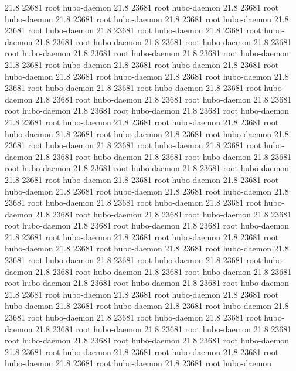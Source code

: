 21.8 23681 root     hubo-daemon
21.8 23681 root     hubo-daemon
21.8 23681 root     hubo-daemon
21.8 23681 root     hubo-daemon
21.8 23681 root     hubo-daemon
21.8 23681 root     hubo-daemon
21.8 23681 root     hubo-daemon
21.8 23681 root     hubo-daemon
21.8 23681 root     hubo-daemon
21.8 23681 root     hubo-daemon
21.8 23681 root     hubo-daemon
21.8 23681 root     hubo-daemon
21.8 23681 root     hubo-daemon
21.8 23681 root     hubo-daemon
21.8 23681 root     hubo-daemon
21.8 23681 root     hubo-daemon
21.8 23681 root     hubo-daemon
21.8 23681 root     hubo-daemon
21.8 23681 root     hubo-daemon
21.8 23681 root     hubo-daemon
21.8 23681 root     hubo-daemon
21.8 23681 root     hubo-daemon
21.8 23681 root     hubo-daemon
21.8 23681 root     hubo-daemon
21.8 23681 root     hubo-daemon
21.8 23681 root     hubo-daemon
21.8 23681 root     hubo-daemon
21.8 23681 root     hubo-daemon
21.8 23681 root     hubo-daemon
21.8 23681 root     hubo-daemon
21.8 23681 root     hubo-daemon
21.8 23681 root     hubo-daemon
21.8 23681 root     hubo-daemon
21.8 23681 root     hubo-daemon
21.8 23681 root     hubo-daemon
21.8 23681 root     hubo-daemon
21.8 23681 root     hubo-daemon
21.8 23681 root     hubo-daemon
21.8 23681 root     hubo-daemon
21.8 23681 root     hubo-daemon
21.8 23681 root     hubo-daemon
21.8 23681 root     hubo-daemon
21.8 23681 root     hubo-daemon
21.8 23681 root     hubo-daemon
21.8 23681 root     hubo-daemon
21.8 23681 root     hubo-daemon
21.8 23681 root     hubo-daemon
21.8 23681 root     hubo-daemon
21.8 23681 root     hubo-daemon
21.8 23681 root     hubo-daemon
21.8 23681 root     hubo-daemon
21.8 23681 root     hubo-daemon
21.8 23681 root     hubo-daemon
21.8 23681 root     hubo-daemon
21.8 23681 root     hubo-daemon
21.8 23681 root     hubo-daemon
21.8 23681 root     hubo-daemon
21.8 23681 root     hubo-daemon
21.8 23681 root     hubo-daemon
21.8 23681 root     hubo-daemon
21.8 23681 root     hubo-daemon
21.8 23681 root     hubo-daemon
21.8 23681 root     hubo-daemon
21.8 23681 root     hubo-daemon
21.8 23681 root     hubo-daemon
21.8 23681 root     hubo-daemon
21.8 23681 root     hubo-daemon
21.8 23681 root     hubo-daemon
21.8 23681 root     hubo-daemon
21.8 23681 root     hubo-daemon
21.8 23681 root     hubo-daemon
21.8 23681 root     hubo-daemon
21.8 23681 root     hubo-daemon
21.8 23681 root     hubo-daemon
21.8 23681 root     hubo-daemon
21.8 23681 root     hubo-daemon
21.8 23681 root     hubo-daemon
21.8 23681 root     hubo-daemon
21.8 23681 root     hubo-daemon
21.8 23681 root     hubo-daemon
21.8 23681 root     hubo-daemon
21.8 23681 root     hubo-daemon
21.8 23681 root     hubo-daemon
